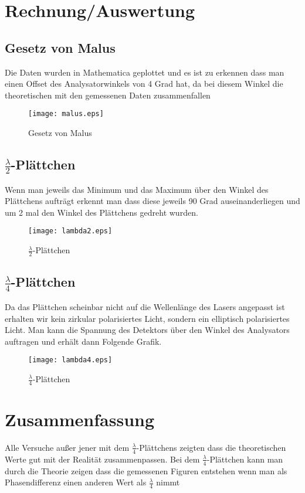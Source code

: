\documentclass[a4paper]{article}
\begin{document}
\section{Rechnung/Auswertung}
\subsection{Gesetz von Malus}
  Die Daten wurden in Mathematica geplottet und es ist zu erkennen dass man einen Offset des Analysatorwinkels von 4 Grad hat, da bei diesem Winkel die theoretischen mit den gemessenen Daten zusammenfallen

  \begin{figure}[ht]
    \begin{center}
      \texttt{[image: malus.eps]}
    \end{center}
    \caption{Gesetz von Malus}
    \label{fig:1}
  \end{figure}

  \subsection{$\frac{\lambda}{2}$-Plättchen}
  Wenn man jeweils das Minimum und das Maximum über den Winkel des Plättchens aufträgt erkennt man dass diese jeweils 90 Grad auseinanderliegen und um 2 mal den Winkel des Plättchens gedreht wurden.

  \begin{figure}[ht]
    \begin{center}
      \texttt{[image: lambda2.eps]}
    \end{center}
    \caption{$\frac{\lambda}{2}$-Plättchen}
    \label{fig:2}
  \end{figure}

  \subsection{$\frac{\lambda}{4}$-Plättchen}
  Da das Plättchen scheinbar nicht auf die Wellenlänge des Lasers angepasst ist erhalten wir kein zirkular polarisiertes Licht, sondern ein elliptisch polarisiertes Licht. Man kann die Spannung des Detektors über den Winkel des Analysators auftragen und erhält dann Folgende Grafik.

  \begin{figure}[ht]
    \begin{center}
      \texttt{[image: lambda4.eps]}
    \end{center}
    \caption{$\frac{\lambda}{4}$-Plättchen}
    \label{fig:3}
  \end{figure}

  \section{Zusammenfassung}

  Alle Versuche außer jener mit dem $\frac{\lambda}{4}$-Plättchens zeigten dass die theoretischen Werte gut mit der Realität zusammenpassen. Bei dem $\frac{\lambda}{4}$-Plättchen kann man durch die Theorie zeigen dass die gemessenen Figuren entstehen wenn man als Phasendifferenz einen anderen Wert als $\frac{\lambda}{4}$ nimmt
\end{document}
